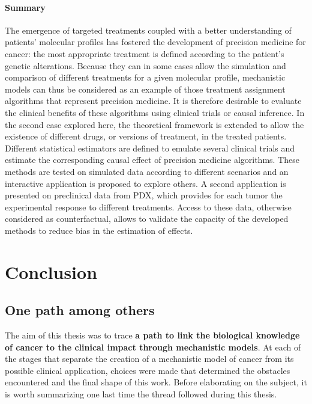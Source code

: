 \documentclass[a4paper,12pt,twoside,onecolumn,openright,final,oldfontcommands]{memoir}
\let\BeginKnitrBlock\begin \let\EndKnitrBlock\end
\begin{document}
\BeginKnitrBlock{conclubox}
\subsubsection*{Summary}\label{summary-8}

The emergence of targeted treatments coupled with a better understanding
of patients' molecular profiles has fostered the development of
precision medicine for cancer: the most appropriate treatment is defined
according to the patient's genetic alterations. Because they can in some
cases allow the simulation and comparison of different treatments for a
given molecular profile, mechanistic models can thus be considered as an
example of those treatment assignment algorithms that represent
precision medicine. It is therefore desirable to evaluate the clinical
benefits of these algorithms using clinical trials or causal inference.
In the second case explored here, the theoretical framework is extended
to allow the existence of different drugs, or versions of treatment, in
the treated patients. Different statistical estimators are defined to
emulate several clinical trials and estimate the corresponding causal
effect of precision medicine algorithms. These methods are tested on
simulated data according to different scenarios and an interactive
application is proposed to explore others. A second application is
presented on preclinical data from PDX, which provides for each tumor
the experimental response to different treatments. Access to these data,
otherwise considered as counterfactual, allows to validate the capacity
of the developed methods to reduce bias in the estimation of effects.
\EndKnitrBlock{conclubox}

\chapter*{Conclusion}\label{conclusion}

\section*{One path among others}\label{one-path-among-others}

The aim of this thesis was to trace \textbf{a path to link the
biological knowledge of cancer to the clinical impact through
mechanistic models}. At each of the stages that separate the creation of
a mechanistic model of cancer from its possible clinical application,
choices were made that determined the obstacles encountered and the
final shape of this work. Before elaborating on the subject, it is worth
summarizing one last time the thread followed during this thesis.
\end{document}
